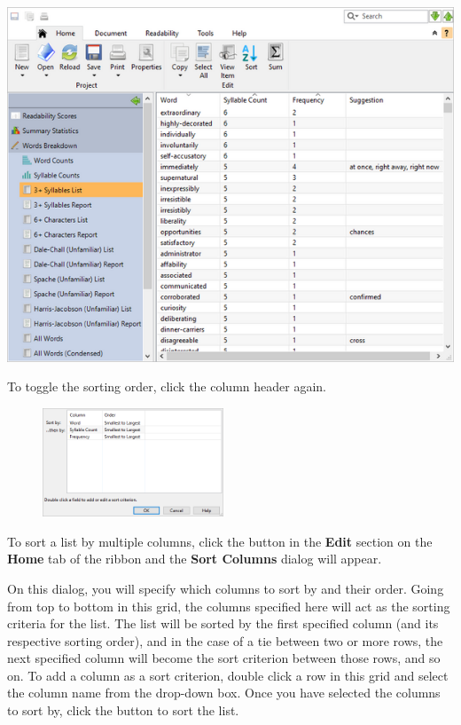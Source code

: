 \documentclass[
]{book}
\theoremstyle{definition}
\theoremstyle{definition}
\theoremstyle{definition}
\theoremstyle{definition}
\theoremstyle{remark}
\begin{document}
\includegraphics{Images/difficultwords.png}

To toggle the sorting order, click the column header again.

\begin{figure}
\includegraphics[width=0.48\textwidth,height=\textheight]{Images/sortcolumnsdialog.png}

\end{figure}

To sort a list by multiple columns, click the  button in the \textbf{Edit} section on the \textbf{Home} tab of the ribbon and the \textbf{Sort Columns} dialog will appear.

On this dialog, you will specify which columns to sort by and their order. Going from top to bottom in this grid, the columns specified here will act as the sorting criteria for the list. The list will be sorted by the first specified column (and its respective sorting order), and in the case of a tie between two or more rows, the next specified column will become the sort criterion between those rows, and so on. To add a column as a sort criterion, double click a row in this grid and select the column name from the drop-down box. Once you have selected the columns to sort by, click the  button to sort the list.
\end{document}

